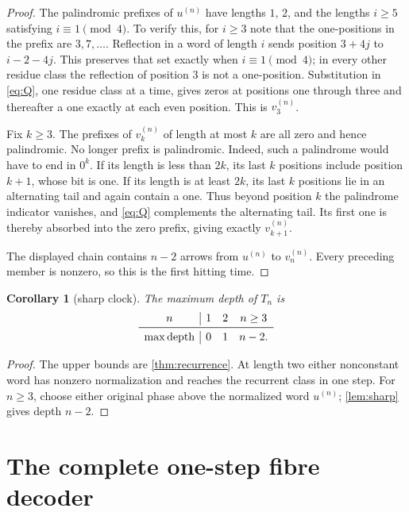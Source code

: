 \documentclass[10pt,a4paper]{amsart}
\newtheorem{corollary}[theorem]{Corollary}
\theoremstyle{definition}
\theoremstyle{remark}
\newcommand{\depth}{\operatorname{depth}}
\begin{document}
\begin{proof}
The palindromic prefixes of $u^{(n)}$ have lengths $1$, $2$, and the lengths
$i\ge5$ satisfying $i\equiv1\pmod4$.  To verify this, for $i\ge3$ note that
the one-positions in the prefix are $3,7,\ldots$.  Reflection in a word of
length $i$ sends position $3+4j$ to $i-2-4j$.  This preserves that set exactly
when $i\equiv1\pmod4$; in every other residue class the reflection of position
$3$ is not a one-position.  Substitution in \eqref{eq:Q}, one residue class
at a time, gives zeros at positions one through three and thereafter a one
exactly at each even position.  This is $v^{(n)}_3$.

Fix $k\ge3$.  The prefixes of $v^{(n)}_k$ of length at most $k$ are all zero
and hence palindromic.  No longer prefix is palindromic.  Indeed, such a
palindrome would have to end in $0^k$.  If its length is less than $2k$, its
last $k$ positions include position $k+1$, whose bit is one.  If its length is
at least $2k$, its last $k$ positions lie in an alternating tail and again
contain a one.  Thus beyond position $k$ the palindrome indicator vanishes,
and \eqref{eq:Q} complements the alternating tail.  Its first one is thereby
absorbed into the zero prefix, giving exactly $v^{(n)}_{k+1}$.

The displayed chain contains $n-2$ arrows from $u^{(n)}$ to $v^{(n)}_n$.
Every preceding member is nonzero, so this is the first hitting time.
\end{proof}

\begin{corollary}[sharp clock]\label{cor:clock}
The maximum depth of $T_n$ is
\[
\begin{array}{c|ccc}
n&1&2&n\ge3\\ \midrule
\max\depth&0&1&n-2.
\end{array}
\]
\end{corollary}

\begin{proof}
The upper bounds are \cref{thm:recurrence}.  At length two either nonconstant
word has nonzero normalization and reaches the recurrent class in one step.
For $n\ge3$, choose either original phase above the normalized word
$u^{(n)}$; \cref{lem:sharp} gives depth $n-2$.
\end{proof}

\section{The complete one-step fibre decoder}
\end{document}
